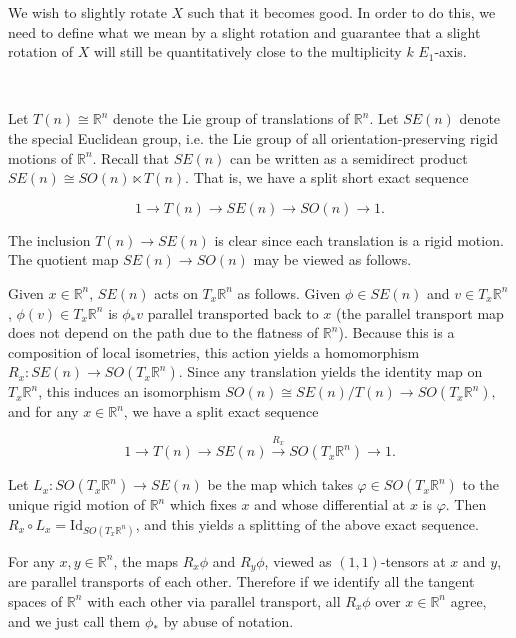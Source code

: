 \documentclass[11pt,reqno,twoside]{amsart}
\theoremstyle{definition}
\begin{document}
We wish to slightly rotate $X$ such that it becomes good. In order to do this, we need to define what we mean by a slight rotation and guarantee that a slight rotation of $X$ will still be quantitatively close to the multiplicity $k$ $E_1$-axis.

\ 

Let $T(n) \cong \mathbb{R}^n$ denote the Lie group of translations of $\mathbb{R}^n$. Let $SE(n)$ denote the special Euclidean group, i.e. the Lie group of all orientation-preserving rigid motions of $\mathbb{R}^n$. Recall that $SE(n)$ can be written as a semidirect product $SE(n) \cong SO(n) \ltimes T(n)$. That is, we have a split short exact sequence

\[1 \longrightarrow T(n) \longrightarrow SE(n) \longrightarrow SO(n) \longrightarrow 1.\]

The inclusion $T(n) \to SE(n)$ is clear since each translation is a rigid motion. The quotient map $SE(n) \to SO(n)$ may be viewed as follows.

Given $x \in \mathbb{R}^n$, $SE(n)$ acts on $T_x \mathbb{R}^n$ as follows. Given $\phi \in SE(n)$ and $v \in T_x\mathbb{R}^n$, $\phi(v) \in T_x \mathbb{R}^n$ is $\phi_* v$ parallel transported back to $x$ (the parallel transport map does not depend on the path due to the flatness of $\mathbb{R}^n$). Because this is a composition of local isometries, this action yields a homomorphism $R_x: SE(n) \to SO(T_x \mathbb{R}^n).$ Since any translation yields the identity map on $T_x\mathbb{R}^n$, this induces an isomorphism $SO(n) \cong SE(n)/T(n) \to SO(T_x\mathbb{R}^n),$ and for any $x \in \mathbb{R}^n$, we have a split exact sequence

\[1 \longrightarrow T(n) \longrightarrow SE(n)  \overset{R_x}\longrightarrow SO(T_x\mathbb{R}^n) \longrightarrow 1.\]

Let $L_x: SO(T_x\mathbb{R}^n) \to SE(n)$ be the map which takes $\varphi \in SO(T_x\mathbb{R}^n)$ to the unique rigid motion of $\mathbb{R}^n$ which fixes $x$ and whose differential at $x$ is $\varphi$. Then $R_x \circ L_x = \mathrm{Id}_{SO(T_x\mathbb{R}^n)}$, and this yields a splitting of the above exact sequence. 

For any $x,y \in \mathbb{R}^n$, the maps $R_x\phi$ and $R_y\phi$, viewed as $(1,1)$-tensors at $x$ and $y$, are parallel transports of each other. Therefore if we identify all the tangent spaces of $\mathbb{R}^n$ with each other via parallel transport, all $R_x \phi$ over $x \in \mathbb{R}^n$ agree, and we just call them $\phi_*$ by abuse of notation.
\end{document}
